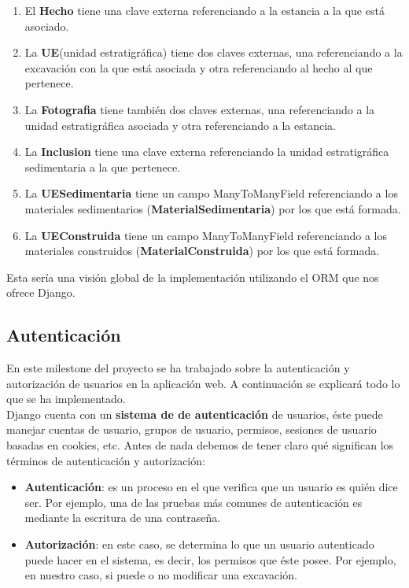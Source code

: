         \begin{enumerate}
            \item El \textbf{Hecho} tiene una clave externa referenciando a la estancia a la
            que está asociado.
            \item La \textbf{UE}(unidad estratigráfica) tiene dos claves externas, una
            referenciando a la excavación con la que está asociada y otra referenciando al
            hecho al que pertenece.
            \item La \textbf{Fotografia} tiene también dos claves externas, una referenciando
            a la unidad estratigráfica asociada y otra referenciando a la estancia.
            \item La \textbf{Inclusion} tiene una clave externa referenciando la unidad
            estratigráfica sedimentaria a la que pertenece.
            \item La \textbf{UESedimentaria} tiene un campo ManyToManyField referenciando a
            los materiales sedimentarios (\textbf{MaterialSedimentaria}) por los que está
            formada.
            \item La \textbf{UEConstruida} tiene un campo ManyToManyField referenciando a
            los materiales construidos (\textbf{MaterialConstruida}) por los que está
            formada.
        \end{enumerate}

    Esta sería una visión global de la implementación utilizando el ORM que nos ofrece Django.

\subsection{Autenticación}
En este milestone del proyecto se ha trabajado sobre la autenticación y autorización de
usuarios en la aplicación web. A continuación se explicará todo lo que se ha
implementado.\\

Django cuenta con un \textbf{sistema de de autenticación} \cite{django-auth} de usuarios,
éste puede manejar cuentas de usuario, grupos de usuario, permisos, sesiones de usuario
basadas en cookies, etc. Antes de nada debemos de tener claro qué significan los términos
de autenticación y autorización:

    \begin{itemize}
        \item \textbf{Autenticación}: es un proceso en el que verifica que un usuario
        es quién dice ser. Por ejemplo, una de las pruebas más comunes de autenticación
        es mediante la escritura de una contraseña.
        \item \textbf{Autorización}: en este caso, se determina lo que un usuario
        autenticado puede hacer en el sistema, es decir, los permisos que éste posee. Por
        ejemplo, en nuestro caso, si puede o no modificar una excavación.
    \end{itemize}

